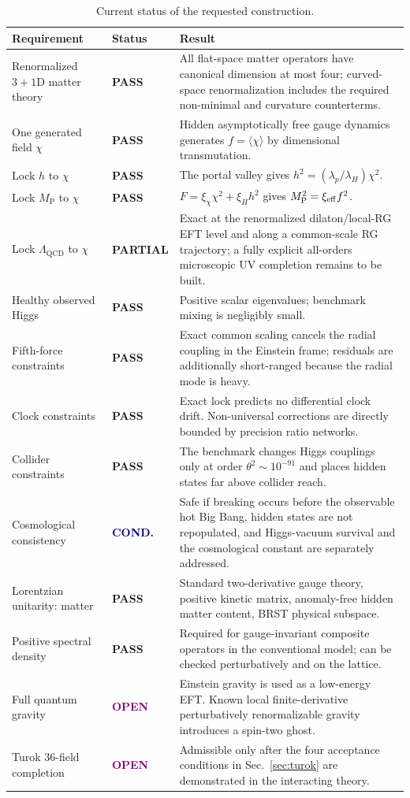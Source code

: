 \documentclass[11pt,a4paper]{article}
\newcommand{\MP}{M_{\mathrm P}}
\newcommand{\QCD}{\mathrm{QCD}}
\newcommand{\Pass}{\textcolor{deepgreen}{\textbf{PASS}}}
\newcommand{\Partial}{\textcolor{deepamber}{\textbf{PARTIAL}}}
\newcommand{\Open}{\textcolor{purple}{\textbf{OPEN}}}
\newcommand{\Conditional}{\textcolor{navy}{\textbf{COND.}}}
\begin{document}
\begin{table}[H]
\centering
\caption{Current status of the requested construction.}
\begin{tabularx}{\textwidth}{@{}L{0.285\textwidth}L{0.13\textwidth}Y@{}}
\toprule
Requirement & Status & Result \\
\midrule
Renormalized $3+1$D matter theory & \Pass & All flat-space matter operators have canonical dimension at most four; curved-space renormalization includes the required non-minimal and curvature counterterms. \\
One generated field $\chi$ & \Pass & Hidden asymptotically free gauge dynamics generates $f=\langle\chi\rangle$ by dimensional transmutation. \\
Lock $h$ to $\chi$ & \Pass & The portal valley gives $h^2=(\lambda_p/\lambda_H)\chi^2$. \\
Lock $\MP$ to $\chi$ & \Pass & $F=\xi_\chi\chi^2+\xi_Hh^2$ gives $\MP^2=\xi_{\rm eff}f^2$. \\
Lock $\Lambda_{\QCD}$ to $\chi$ & \Partial & Exact at the renormalized dilaton/local-RG EFT level and along a common-scale RG trajectory; a fully explicit all-orders microscopic UV completion remains to be built. \\
Healthy observed Higgs & \Pass & Positive scalar eigenvalues; benchmark mixing is negligibly small. \\
Fifth-force constraints & \Pass & Exact common scaling cancels the radial coupling in the Einstein frame; residuals are additionally short-ranged because the radial mode is heavy. \\
Clock constraints & \Pass & Exact lock predicts no differential clock drift. Non-universal corrections are directly bounded by precision ratio networks. \\
Collider constraints & \Pass & The benchmark changes Higgs couplings only at order $\theta^2\sim10^{-91}$ and places hidden states far above collider reach. \\
Cosmological consistency & \Conditional & Safe if breaking occurs before the observable hot Big Bang, hidden states are not repopulated, and Higgs-vacuum survival and the cosmological constant are separately addressed. \\
Lorentzian unitarity: matter & \Pass & Standard two-derivative gauge theory, positive kinetic matrix, anomaly-free hidden matter content, BRST physical subspace. \\
Positive spectral density & \Pass & Required for gauge-invariant composite operators in the conventional model; can be checked perturbatively and on the lattice. \\
Full quantum gravity & \Open & Einstein gravity is used as a low-energy EFT. Known local finite-derivative perturbatively renormalizable gravity introduces a spin-two ghost. \\
Turok 36-field completion & \Open & Admissible only after the four acceptance conditions in Sec.~\ref{sec:turok} are demonstrated in the interacting theory. \\
\bottomrule
\end{tabularx}
\end{table}
\end{document}
